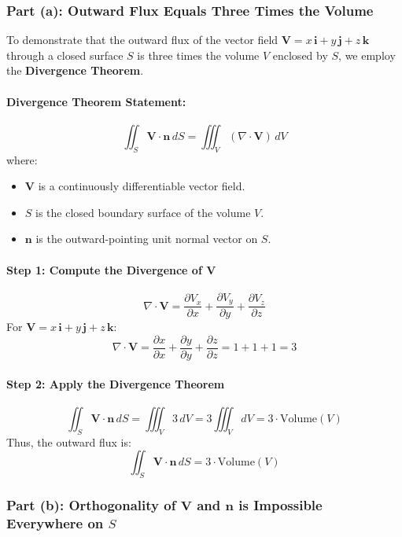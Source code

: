 \documentclass[11pt]{article}
\begin{document}
\subsubsection*{Part (a): Outward Flux Equals Three Times the Volume}

To demonstrate that the outward flux of the vector field \( \mathbf{V} = x\,\mathbf{i} + y\,\mathbf{j} + z\,\mathbf{k} \) through a closed surface \( S \) is three times the volume \( V \) enclosed by \( S \), we employ the \textbf{Divergence Theorem}.

\paragraph{Divergence Theorem Statement:}
\[
\iint_{S} \mathbf{V} \cdot \mathbf{n} \, dS = \iiint_{V} (\nabla \cdot \mathbf{V}) \, dV
\]
where:
\begin{itemize}
    \item \( \mathbf{V} \) is a continuously differentiable vector field.
    \item \( S \) is the closed boundary surface of the volume \( V \).
    \item \( \mathbf{n} \) is the outward-pointing unit normal vector on \( S \).
\end{itemize}

\paragraph{Step 1: Compute the Divergence of \( \mathbf{V} \)}
\[
\nabla \cdot \mathbf{V} = \frac{\partial V_x}{\partial x} + \frac{\partial V_y}{\partial y} + \frac{\partial V_z}{\partial z}
\]
For \( \mathbf{V} = x\,\mathbf{i} + y\,\mathbf{j} + z\,\mathbf{k} \):
\[
\nabla \cdot \mathbf{V} = \frac{\partial x}{\partial x} + \frac{\partial y}{\partial y} + \frac{\partial z}{\partial z} = 1 + 1 + 1 = 3
\]

\paragraph{Step 2: Apply the Divergence Theorem}
\[
\iint_{S} \mathbf{V} \cdot \mathbf{n} \, dS = \iiint_{V} 3 \, dV = 3 \iiint_{V} dV = 3 \cdot \text{Volume}(V)
\]
Thus, the outward flux is:
\[
\boxed{ \iint_{S} \mathbf{V} \cdot \mathbf{n} \, dS = 3 \cdot \text{Volume}(V) }
\]

\subsubsection*{Part (b): Orthogonality of \( \mathbf{V} \) and \( \mathbf{n} \) is Impossible Everywhere on \( S \)}
\end{document}
